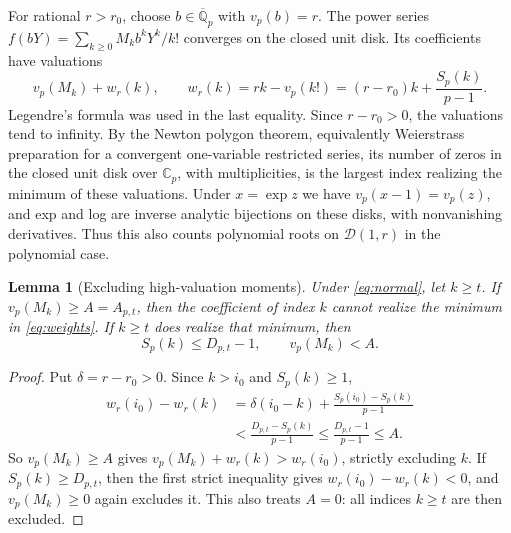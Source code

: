 \documentclass[11pt]{article}
\newtheorem{lemma}[theorem]{Lemma}
\theoremstyle{remark}\newtheorem{remark}[theorem]{Remark}
\newcommand{\Q}{\mathbb Q}\newcommand{\Z}{\mathbb Z}\newcommand{\F}{\mathbb F}\newcommand{\C}{\mathbb C}
\newcommand{\vp}{v_p}\newcommand{\ord}{\operatorname{ord}}\newcommand{\spn}{\operatorname{span}}\newcommand{\res}{\operatorname{res}}
\newcommand{\D}{\mathcal D}\newcommand{\R}{\mathcal R}\newcommand{\Ocal}{\mathcal O}
\begin{document}
For rational $r>r_0$, choose $b\in\overline{\Q}_p$ with $\vp(b)=r$. The power series
$f(bY)=\sum_{k\ge0}M_k b^kY^k/k!$ converges on the closed unit disk. Its coefficients
have valuations
\begin{equation}\label{eq:weights}
 \vp(M_k)+w_r(k),\qquad
 w_r(k)=rk-\vp(k!)=(r-r_0)k+\frac{S_p(k)}{p-1}.
\end{equation}
Legendre's formula was used in the last equality. Since $r-r_0>0$, the valuations
tend to infinity. By the Newton polygon theorem, equivalently Weierstrass preparation
for a convergent one-variable restricted series, its number of zeros in the closed unit
disk over $\C_p$, with multiplicities, is the largest index realizing the minimum of
these valuations. Under $x=\exp z$ we have $\vp(x-1)=\vp(z)$, and exp and log are inverse
analytic bijections on these disks, with nonvanishing derivatives. Thus this also counts
polynomial roots on $\D(1,r)$ in the polynomial case.

\begin{lemma}[Excluding high-valuation moments]\label{lem:exclude}
Under \eqref{eq:normal}, let $k\ge t$. If $\vp(M_k)\ge A=A_{p,t}$, then the coefficient
of index $k$ cannot realize the minimum in \eqref{eq:weights}. If $k\ge t$ does realize
that minimum, then
\[
 S_p(k)\le D_{p,t}-1,\qquad \vp(M_k)<A.
\]
\end{lemma}
\begin{proof}
Put $\delta=r-r_0>0$. Since $k>i_0$ and $S_p(k)\ge1$,
\begin{align*}
 w_r(i_0)-w_r(k)
 &=\delta(i_0-k)+\frac{S_p(i_0)-S_p(k)}{p-1}\\
 &<\frac{D_{p,t}-S_p(k)}{p-1}
 \le\frac{D_{p,t}-1}{p-1}\le A.
\end{align*}
So $\vp(M_k)\ge A$ gives $\vp(M_k)+w_r(k)>w_r(i_0)$, strictly excluding $k$.
If $S_p(k)\ge D_{p,t}$, then the first strict inequality gives
$w_r(i_0)-w_r(k)<0$, and $\vp(M_k)\ge0$ again excludes it. This also treats
$A=0$: all indices $k\ge t$ are then excluded.
\end{proof}
\end{document}

